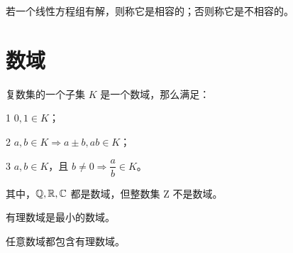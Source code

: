 若一个线性方程组有解，则称它是相容的；否则称它是不相容的。

\section{数域}

\begin{definition}
	复数集的一个子集 $K$ 是一个数域，那么满足：
	
	\num{1} $0,1\in K$；
	
	\num{2} $a,b\in K \Rightarrow a \pm b,ab\in K$；
	
	\num{3} $a,b \in K$，且 $b\ne 0 \Rightarrow \dfrac{a}{b}\in K$。
\end{definition}

其中，$\mathbb{Q},\mathbb{R},\mathbb{C}$ 都是数域，但整数集 $\mathrm{Z}$ 不是数域。

有理数域是最小的数域。

\begin{theorem}
	任意数域都包含有理数域。
\end{theorem}


